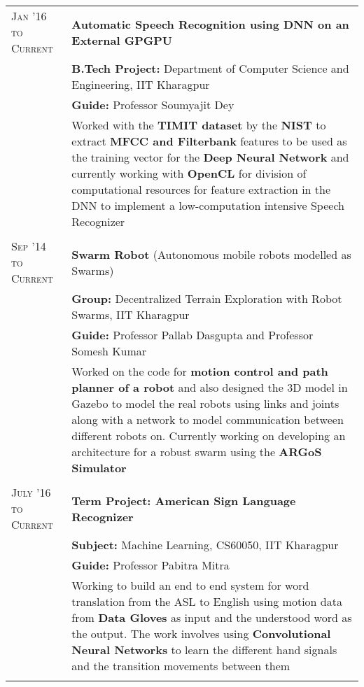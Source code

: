 \documentclass[a4paper,10pt]{extarticle} %
\begin{document}
\begin{tabular}{R{3.0cm}|p{15.0cm}}
\textsc{Jan '16 to Current} & \textbf{Automatic Speech Recognition using DNN on an External GPGPU} \\
 & \textbf{B.Tech Project: }\textmd{Department of Computer Science and Engineering}, IIT Kharagpur\\
& \textbf{Guide: }\textmd{Professor Soumyajit Dey}\\
& \textmd{Worked with the \textbf{TIMIT dataset} by the \textbf{NIST} to extract \textbf{MFCC and Filterbank} features to be used as the training vector for the \textbf{Deep Neural Network} and currently working with \textbf{OpenCL} for division of computational resources for feature extraction in the DNN to implement a low-computation intensive Speech Recognizer}\\
 \\

\textsc{Sep '14 to Current} & \textbf{Swarm Robot} \textmd{(Autonomous mobile robots modelled as Swarms)} \\
 & \textbf{Group: }\textmd{Decentralized Terrain Exploration with Robot Swarms}, IIT Kharagpur\\
& \textbf{Guide: }\textmd{Professor Pallab Dasgupta} and \textmd{Professor Somesh Kumar}\\
& \textmd{Worked on the code for \textbf{motion control and path planner of a robot} and also designed the 3D model in Gazebo to model the real robots using links and joints along with a network to model communication between different robots on. Currently working on developing an architecture for a robust swarm using the \textbf{ARGoS Simulator}}\\
 \\

\textsc{July '16 to Current} & \textbf{Term Project: American Sign Language Recognizer} \\
 & \textbf{Subject: }\textmd{Machine Learning, CS60050}, IIT Kharagpur\\
& \textbf{Guide: }\textmd{Professor Pabitra Mitra}\\
& \textmd{Working to build an end to end system for word translation from the ASL to English using motion data from \textbf{Data Gloves} as input and the understood word as the output. The work involves using \textbf{Convolutional Neural Networks} to learn the different hand signals and the transition movements between them }\\
 \\


\end{tabular}
\end{document}
